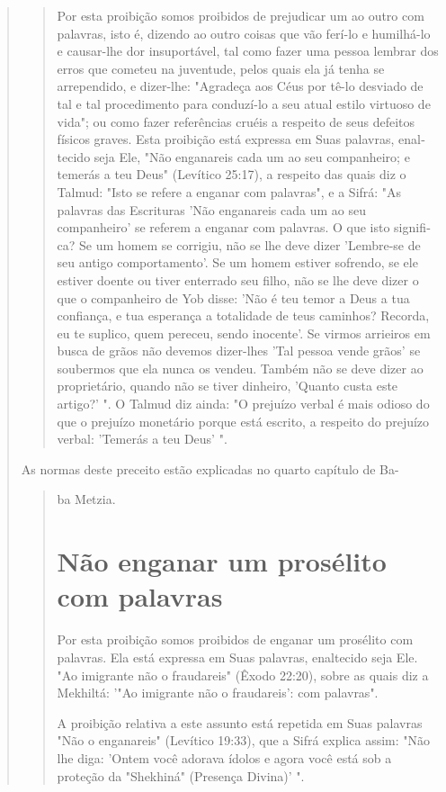 \begin{quote}
\begin{quote}
Por esta proibição somos proibidos de prejudicar um ao outro com
palavras, isto é, dizendo ao outro coisas que vão ferí-lo e humilhá-lo e
causar-lhe dor insuportável, tal como fazer uma pessoa lembrar dos erros
que come­teu na juventude, pelos quais ela já tenha se arrependido, e
dizer-lhe: "Agrade­ça aos Céus por tê-lo desviado de tal e tal
procedimento para conduzí-lo a seu atual estilo virtuoso de vida"; ou
como fazer referências cruéis a respeito de seus defeitos físicos
graves. Esta proibição está expressa em Suas palavras, enal­tecido seja
Ele, "Não enganareis cada um ao seu companheiro; e temerás a teu Deus"
(Levítico 25:17), a respeito das quais diz o Talmud: "Isto se refere a
en­ganar com palavras", e a Sifrá: "As palavras das Escrituras 'Não
enganareis cada um ao seu companheiro' se referem a enganar com
palavras. O que isto signifi­ca? Se um homem se corrigiu, não se lhe
deve dizer 'Lembre-se de seu antigo comportamento'. Se um homem estiver
sofrendo, se ele estiver doente ou ti­ver enterrado seu filho, não se
lhe deve dizer o que o companheiro de Yob disse: 'Não é teu temor a Deus
a tua confiança, e tua esperança a totalidade de teus caminhos? Recorda,
eu te suplico, quem pereceu, sendo inocente'. Se vir­mos arrieiros em
busca de grãos não devemos dizer-lhes 'Tal pessoa vende grãos' se
soubermos que ela nunca os vendeu. Também não se deve dizer ao
proprie­tário, quando não se tiver dinheiro, 'Quanto custa este artigo?'
". O Talmud diz ainda: "O prejuízo verbal é mais odioso do que o
prejuízo monetário por­que está escrito, a respeito do prejuízo verbal:
'Temerás a teu Deus' ".
\end{quote}

As normas deste preceito estão explicadas no quarto capítulo de Ba-

\begin{quote}
ba Metzia.

\section{Não enganar um prosélito com palavras}

Por esta proibição somos proibidos de enganar um prosélito com palavras.
Ela está expressa em Suas palavras, enaltecido seja Ele. "Ao imigrante
não o fraudareis" (Êxodo 22:20), sobre as quais diz a Mekhiltá: '"Ao
imigrante não o fraudareis': com palavras".

A proibição relativa a este assunto está repetida em Suas palavras "Não
o enganareis" (Levítico 19:33), que a Sifrá explica assim: "Não lhe
diga: 'On­tem você adorava ídolos e agora você está sob a proteção da
"Shekhiná" (Pre­sença Divina)' ".


\end{quote}
\end{quote}
